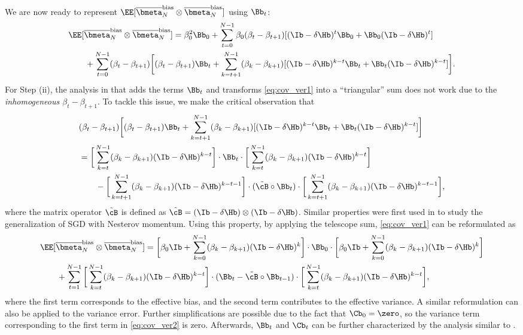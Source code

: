 \documentclass[11pt]{article}
\newcommand{\obmeta}{\overline{\bmeta}}
\begin{document}
We are now ready to represent $\EE[\obmeta_N^{\mathrm{bias}}\otimes\obmeta_N^{\mathrm{bias}}]$ using $\Bb_t$:
\begin{align}
&\EE[\obmeta_N^{\mathrm{bias}}\otimes\obmeta_N^{\mathrm{bias}}]=\beta_0^2\Bb_0+\sum_{t=0}^{N-1}\beta_0(\beta_t-\beta_{t+1})[(\Ib-\delta\Hb)^t\Bb_0+\Bb_0(\Ib-\delta\Hb)^t]\nonumber\\
&\qquad+\sum_{t=0}^{N-1}(\beta_t-\beta_{t+1})\bigg[(\beta_t-\beta_{t+1})\Bb_t+\sum_{k=t+1}^{N-1}(\beta_k-\beta_{k+1})[(\Ib-\delta\Hb)^{k-t}\Bb_t+\Bb_t(\Ib-\delta\Hb)^{k-t}]\bigg].\label{eq:cov_ver1}
\end{align}
For Step (ii), the analysis in \citet{zou2021benign, wu2022last} that adds the terms $\Bb_t$ and transforms \eqref{eq:cov_ver1} into a ``triangular'' sum does not work due to the \emph{inhomogeneous $\beta_t-\beta_{t+1}$}. To tackle this issue, we make the critical observation that
\begin{align*}
&(\beta_t-\beta_{t+1})\bigg[(\beta_t-\beta_{t+1})\Bb_t+\sum_{k=t+1}^{N-1}(\beta_k-\beta_{k+1})[(\Ib-\delta\Hb)^{k-t}\Bb_t+\Bb_t(\Ib-\delta\Hb)^{k-t}]\bigg]\\
&=\bigg[\sum_{k=t}^{N-1}(\beta_k-\beta_{k+1})(\Ib-\delta\Hb)^{k-t}\bigg]\cdot\Bb_t\cdot\bigg[\sum_{k=t}^{N-1}(\beta_k-\beta_{k+1})(\Ib-\delta\Hb)^{k-t}\bigg]\\
&\qquad-\bigg[\sum_{k=t+1}^{N-1}(\beta_k-\beta_{k+1})(\Ib-\delta\Hb)^{k-t-1}\bigg]\cdot(\tilde\cB\circ\Bb_t)\cdot\bigg[\sum_{k=t+1}^{N-1}(\beta_k-\beta_{k+1})(\Ib-\delta\Hb)^{k-t-1}\bigg],
\end{align*}
where the matrix operator $\tilde\cB$ is defined as $\tilde\cB=(\Ib-\delta\Hb)\otimes(\Ib-\delta\Hb)$.
Similar properties were first used in \citet{li2023risk} to study the generalization of SGD with Nesterov momentum. Using this property, by applying the telescope sum, \eqref{eq:cov_ver1} can be reformulated as
\begin{align}
&\EE[\obmeta_N^{\mathrm{bias}}\otimes\obmeta_N^{\mathrm{bias}}]=\bigg[\beta_0\Ib+\sum_{k=0}^{N-1}(\beta_k-\beta_{k+1})(\Ib-\delta\Hb)^k\bigg]\cdot\Bb_0\cdot\bigg[\beta_0\Ib+\sum_{k=0}^{N-1}(\beta_k-\beta_{k+1})(\Ib-\delta\Hb)^k\bigg]\nonumber\\
&\qquad+\sum_{t=1}^{N-1}\bigg[\sum_{k=t}^{N-1}(\beta_k-\beta_{k+1})(\Ib-\delta\Hb)^{k-t}\bigg]\cdot(\Bb_t-\tilde\cB\circ\Bb_{t-1})\cdot\bigg[\sum_{k=t}^{N-1}(\beta_k-\beta_{k+1})(\Ib-\delta\Hb)^{k-t}\bigg],\label{eq:cov_ver2}
\end{align}
where the first term corresponds to the effective bias, and the second term contributes to the effective variance.
A similar reformulation can also be applied to the variance error. Further simplifications are possible due to the fact that $\Cb_0=\zero$, so the variance term corresponding to the first term in \eqref{eq:cov_ver2} is zero. Afterwards, $\Bb_t$ and $\Cb_t$ can be further characterized by the analysis similar to \citet{zou2021benign}.
\end{document}
